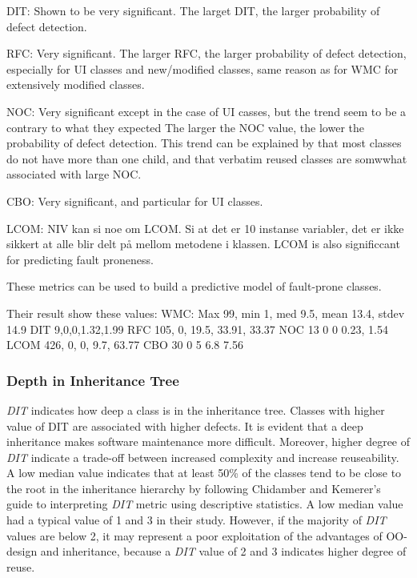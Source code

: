 DIT: Shown to be very significant. The larget DIT, the larger probability of defect detection.

RFC: Very significant. The larger RFC, the larger probability of defect detection, especially for UI classes and new/modified classes, same reason as for WMC for extensively modified classes.

NOC: Very significant except in the case of UI casses, but the trend seem to be a contrary to what they expected The larger the NOC value, the lower the probability of defect detection. This trend can be explained by that most classes do not have more than one child, and that verbatim reused classes are somwwhat associated with large NOC.

CBO: Very significant, and particular for UI classes.

LCOM: NIV kan si noe om LCOM. Si at det er 10 instanse variabler, det er ikke sikkert at alle blir delt på mellom metodene i klassen. LCOM is also significcant for predicting fault proneness.

These metrics can be used to build a predictive model of fault-prone classes.

Their result show these values:
WMC: Max 99, min 1, med 9.5, mean 13.4, stdev 14.9
DIT 9,0,0,1.32,1.99
RFC 105, 0, 19.5, 33.91, 33.37
NOC 13 0 0 0.23, 1.54
LCOM 426, 0, 0, 9.7, 63.77
CBO 30 0 5 6.8 7.56
\fi







\subsubsection{Depth in Inheritance Tree}
\textit{DIT} indicates how deep a class is in the inheritance tree. Classes with higher value of DIT are associated with higher defects\cite{subramanyam2003empirical}. It is evident that a deep inheritance makes software maintenance more difficult\cite{daly1996evaluating}. Moreover, higher degree of \textit{DIT} indicate a trade-off between increased complexity and increase reuseability. A low median value indicates that at least 50\% of the classes tend to be close to the root in the inheritance hierarchy by following Chidamber and Kemerer's\cite{chidamber1994metrics} guide to interpreting \textit{DIT} metric using descriptive statistics. A low median value had a typical value of 1 and 3 in their study. However, if the majority of \textit{DIT} values are below 2, it may represent a poor exploitation of the advantages of OO-design and inheritance, because a \textit{DIT} value of 2 and 3 indicates higher degree of reuse. 


